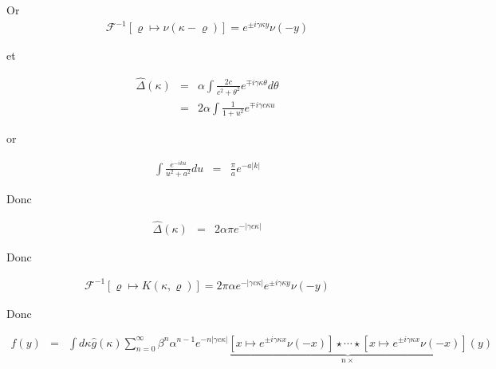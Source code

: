 Or 
\begin{eqnarray*}
	\mathcal{F}^{-1} [ \varrho \mapsto \hat{\nu} ( \kappa - \varrho ) ] = e^{\pm i \gamma \kappa y } \nu ( - y) 	
\end{eqnarray*}

et

\begin{eqnarray*}
	\hat{\Delta}(\kappa) & = & \alpha \int \frac{ 2 c } { c^2 + \theta^2 } e^{\mp i \gamma \kappa \theta } d \theta  \\
	& = & 2 \alpha \int \frac{1}{1 + u^2 } e^{ \mp i \gamma c \kappa u } 	
\end{eqnarray*}



or 

\begin{eqnarray*}
	\int \frac{ e^{ -i  k u }}{ u^2 + a^2 } du & = & \frac{ \pi }{ a } e^{- a \vert k \vert } 	
\end{eqnarray*}

Donc 

\begin{eqnarray*}
	\hat{\Delta}(\kappa) & = & 2 \alpha \pi e^{- \vert \gamma c \kappa \vert } 		
\end{eqnarray*}


 

Donc 

\begin{eqnarray*}
	\mathcal{F}^{-1} [ \varrho \mapsto K ( \kappa , \varrho ) ] =  2 \pi \alpha e^{- \vert \gamma c \kappa \vert }  e^{\pm i \gamma \kappa y } \nu ( - y) 	
\end{eqnarray*}

Donc 

\begin{eqnarray*}
	f(y) & = & \int d \kappa\hat{g}( \kappa ) \sum_{n =0 }^{\infty} \beta^{n}\alpha^{n-1} e^{- n\vert \gamma c \kappa \vert }  \underbrace{[ x \mapsto e^{\pm i \gamma \kappa x } \nu ( - x)]\star \cdots \star [ x \mapsto e^{\pm i \gamma \kappa x } \nu ( - x)]}_{n \times} (y)  	
\end{eqnarray*}














 
